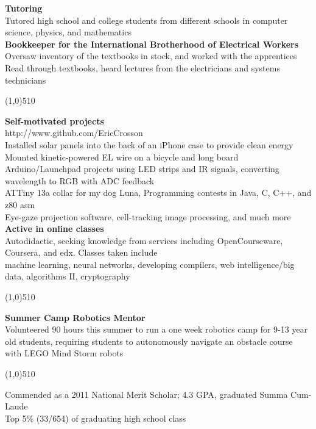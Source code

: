 \documentclass{report}
\begin{document}
\textbf{Tutoring} \\
Tutored high school and college students from different schools in computer science, physics, and mathematics \\

\textbf{Bookkeeper for the International Brotherhood of Electrical Workers} \\
Oversaw inventory of the textbooks in stock, and worked with the apprentices
Read through textbooks, heard lectures from the electricians and systems technicians

\begin{center}
\line(1,0){510}
\end{center}

\textbf{Self-motivated projects} \\
http://www.github.com/EricCrosson \\
Installed solar panels into the back of an iPhone case to provide clean energy \\
Mounted kinetic-powered EL wire on a bicycle and long board \\
Arduino/Launchpad projects using LED strips and IR signals, converting wavelength to RGB with ADC feedback \\
ATTiny 13a collar for my dog Luna, Programming contests in Java, C, C++, and z80 asm \\
Eye-gaze projection software, cell-tracking image processing, and much more \\

\textbf{Active in online classes} \\
Autodidactic, seeking knowledge from services including OpenCourseware, Coursera, and edx. Classes taken include \\
machine learning, neural networks, developing compilers, web intelligence/big data, algorithms II, cryptography

\begin{center}
\line(1,0){510}
\end{center}

\textbf{Summer Camp Robotics Mentor} \\
Volunteered 90 hours this summer to run a one week robotics camp for 9-13 year old students, requiring students to autonomously navigate an obstacle course with LEGO Mind Storm robots

\begin{center}
\line(1,0){510}
\end{center}

Commended as a 2011 National Merit Scholar; 4.3 GPA, graduated Summa Cum-Laude \\
Top 5\% (33/654) of graduating high school class
\end{document}
